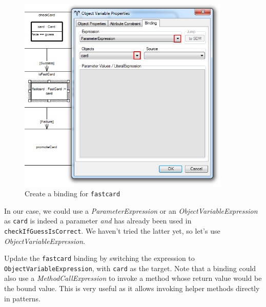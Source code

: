 \begin{stepbystep}
\vspace{0.5cm}

\begin{figure}[htbp]
\begin{center}
  \includegraphics[width=0.9\textwidth]{../../org.moflon.doc.handbook.03_storyDiagrams/11_fastCards/visFCImages/ea_fastCardBinding}
  \caption{Create a binding for \texttt{fastcard}}  
  \label{ea:fastCardBinding}
\end{center}
\end{figure}

\clearpage

In our case, we could use a \emph{ParameterExpression} or an \emph{ObjectVariableExpression} as \texttt{card} is indeed a
parameter \emph{and} has already been used in \texttt{checkIfGuessIsCorrect}. We haven't tried the latter yet, so let's use \emph{ObjectVariableExpression}.

\item Update the \texttt{fastcard} binding by switching the expression to 
\texttt{Object\-Vari\-able\-Ex\-pres\-sion}, with \texttt{card} as the target. Note that a binding could also use a \emph{MethodCallExpression} to invoke a
method whose return value would be the bound value. This is very useful as it allows invoking helper methods directly in patterns.


\end{stepbystep}
